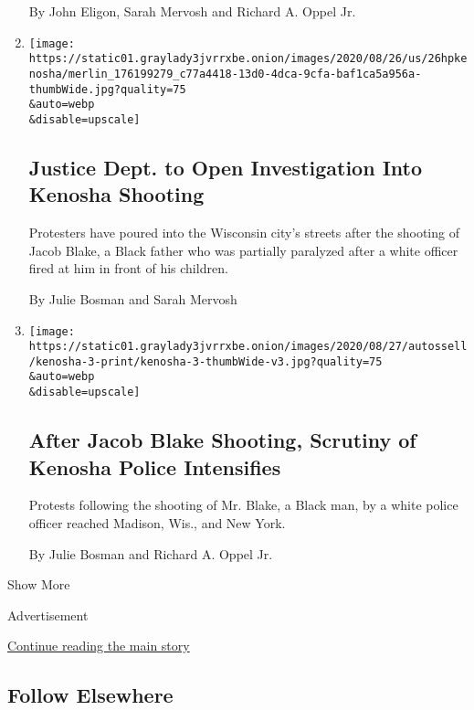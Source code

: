 \begin{enumerate}
  By John Eligon, Sarah Mervosh and Richard A. Oppel Jr.
\item
  \href{/2020/08/26/us/kenosha-shooting-protests-jacob-blake.html}{}

  \texttt{[image: https://static01.graylady3jvrrxbe.onion/images/2020/08/26/us/26hpkenosha/merlin\_176199279\_c77a4418-13d0-4dca-9cfa-baf1ca5a956a-thumbWide.jpg?quality=75\\\&auto=webp\\\&disable=upscale]}

  \hypertarget{justice-dept-to-open-investigation-into-kenosha-shooting}{%
  \subsection{Justice Dept. to Open Investigation Into Kenosha
  Shooting}\label{justice-dept-to-open-investigation-into-kenosha-shooting}}

  Protesters have poured into the Wisconsin city's streets after the
  shooting of Jacob Blake, a Black father who was partially paralyzed
  after a white officer fired at him in front of his children.

  By Julie Bosman and Sarah Mervosh
\item
  \href{/2020/08/25/us/jacob-blake-kenosha-fires.html}{}

  \texttt{[image: https://static01.graylady3jvrrxbe.onion/images/2020/08/27/autossell/kenosha-3-print/kenosha-3-thumbWide-v3.jpg?quality=75\\\&auto=webp\\\&disable=upscale]}

  \hypertarget{after-jacob-blake-shooting-scrutiny-of-kenosha-police-intensifies}{%
  \subsection{After Jacob Blake Shooting, Scrutiny of Kenosha Police
  Intensifies}\label{after-jacob-blake-shooting-scrutiny-of-kenosha-police-intensifies}}

  Protests following the shooting of Mr. Blake, a Black man, by a white
  police officer reached Madison, Wis., and New York.

  By Julie Bosman and Richard A. Oppel Jr.
\end{enumerate}

Show More

Advertisement

\protect\hyperlink{after-mid2}{Continue reading the main story}

\hypertarget{follow-elsewhere}{%
\subsection{Follow Elsewhere}\label{follow-elsewhere}}

